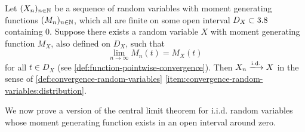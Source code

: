 
\begin{fact}\label{fact:mgf-convergence}
Let $(X_n)_{n\in\mathbb{N}}$ be a sequence of random variables with moment generating functions $(M_n)_{n\in\mathbb{N}}$, which all are finite on some open interval $D_X \subset 3.8$ containing $0$.
Suppose there exists a random variable $X$ with moment generating function $M_X$, also defined on $D_X$, such that
\[
\lim_{n\to\infty}M_n(t)
=
M_X(t)
\]
for all $t \in D_X$ (see \autoref{def:function-pointwise-convergence}).
Then $X_n \xlongrightarrow{\text{i.d.}} X$ in the sense of \autoref{def:convergence-random-variables} \ref{item:convergence-random-variables:distribution}.
\end{fact}

We now prove a version of the central limit theorem for i.i.d. random variables whose moment generating function exists in an open interval around zero.

